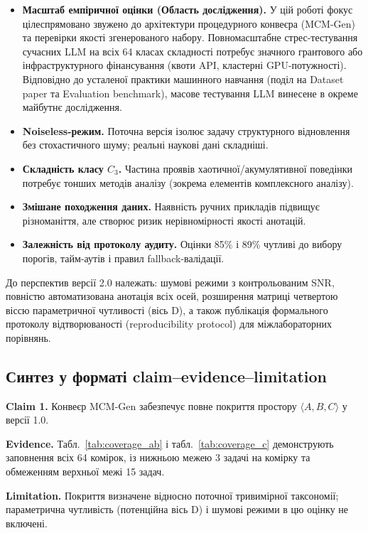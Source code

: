 \documentclass[11pt]{article}
\begin{document}
\begin{itemize}[leftmargin=1.5em]
  \item \textbf{Масштаб емпіричної оцінки (Область дослідження).} У цій роботі фокус цілеспрямовано звужено до архітектури процедурного конвеєра (MCM-Gen) та перевірки якості згенерованого набору. Повномасштабне стрес-тестування сучасних LLM на всіх 64 класах складності потребує значного грантового або інфраструктурного фінансування (квоти API, кластерні GPU-потужності). Відповідно до усталеної практики машинного навчання (поділ на Dataset paper та Evaluation benchmark), масове тестування LLM винесене в окреме майбутнє дослідження.
  \item \textbf{Noiseless-режим.} Поточна версія ізолює задачу структурного відновлення без стохастичного шуму; реальні наукові дані складніші.
  \item \textbf{Складність класу $C_3$.} Частина проявів хаотичної/акумулятивної поведінки потребує тонших методів аналізу (зокрема елементів комплексного аналізу).
  \item \textbf{Змішане походження даних.} Наявність ручних прикладів підвищує різноманіття, але створює ризик нерівномірності якості анотацій.
  \item \textbf{Залежність від протоколу аудиту.} Оцінки 85\% і 89\% чутливі до вибору порогів, тайм-аутів і правил fallback-валідації.
\end{itemize}

До перспектив версії 2.0 належать: шумові режими з контрольованим SNR, повністю автоматизована анотація всіх осей, розширення матриці четвертою віссю параметричної чутливості (вісь D), а також публікація формального протоколу відтворюваності (reproducibility protocol) для міжлабораторних порівнянь.

\subsection{Синтез у форматі claim--evidence--limitation}

\textbf{Claim 1.} Конвеєр MCM-Gen забезпечує повне покриття простору $\langle A,B,C\rangle$ у версії 1.0.

\textbf{Evidence.} Табл.~\ref{tab:coverage_ab} і табл.~\ref{tab:coverage_c} демонструють заповнення всіх 64 комірок, із нижньою межею 3 задачі на комірку та обмеженням верхньої межі 15 задач.

\textbf{Limitation.} Покриття визначене відносно поточної тривимірної таксономії; параметрична чутливість (потенційна вісь D) і шумові режими в цю оцінку не включені.
\end{document}
